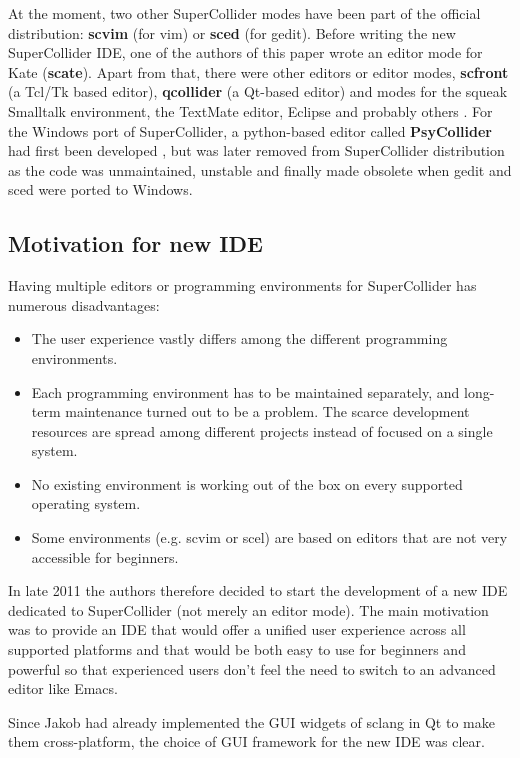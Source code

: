 \documentclass[11pt,a4paper]{article}
\begin{document}
At the moment, two other SuperCollider modes have been part of the official distribution: \textbf{scvim} (for vim) or
\textbf{sced} (for gedit). Before writing the new SuperCollider IDE, one of the authors of this paper
wrote an editor mode for Kate (\textbf{scate}). Apart from that, there were other editors or editor modes,
\textbf{scfront} (a Tcl/Tk based editor), \textbf{qcollider} (a Qt-based editor) and modes for the squeak Smalltalk
environment, the TextMate editor, Eclipse and probably others \cite{collision}. For the Windows port of SuperCollider, a
python-based editor called \textbf{PsyCollider} had first been developed \cite{dos}, but was later removed from
SuperCollider distribution as the code was unmaintained, unstable and finally made obsolete when gedit and sced were
ported to Windows.

\subsection{Motivation for new IDE}

Having multiple editors or programming environments for SuperCollider has numerous disadvantages:

\begin{itemize}
\item The user experience vastly differs among the different programming environments.
\item Each programming environment has to be maintained separately, and long-term maintenance turned out to be a
  problem. The scarce development resources are spread among different projects instead of focused on a single system.
\item No existing environment is working out of the box on every supported operating system.
\item Some environments (e.g. scvim or scel) are based on editors that are not very accessible for beginners.
\end{itemize}

In late 2011 the authors therefore decided to start the development of a new IDE dedicated to SuperCollider (not
merely an editor mode). The main motivation was to provide an IDE that would offer a unified user experience across all
supported platforms and that would be both easy to use for beginners and powerful so that experienced users don't feel the
need to switch to an advanced editor like Emacs.

Since Jakob had already implemented the GUI widgets of sclang in Qt to make them cross-platform, the choice of GUI
framework for the new IDE was clear.
\end{document}
